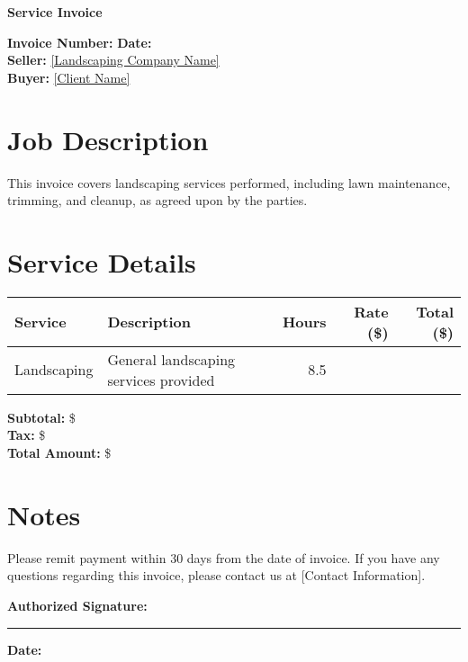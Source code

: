 \documentclass[12pt]{article}
\begin{document}
\begin{center}
    {\Large \textbf{Service Invoice}}\\[0.5cm]
\end{center}

\noindent 
\textbf{Invoice Number:} \underline{\hspace{5cm}} \hfill \textbf{Date:} \underline{\hspace{5cm}}\\[0.5cm]

\noindent 
\textbf{Seller:} \underline{[Landscaping Company Name]}\\[0.2cm]
\noindent 
\textbf{Buyer:} \underline{[Client Name]}\\[0.5cm]

\section*{Job Description}
This invoice covers landscaping services performed, including lawn maintenance, trimming, and cleanup, as agreed upon by the parties.

\section*{Service Details}
\begin{tabularx}{\textwidth}{l X r r r}
\toprule
\textbf{Service} & \textbf{Description} & \textbf{Hours} & \textbf{Rate (\$)} & \textbf{Total (\$)} \\
\midrule
Landscaping & General landscaping services provided & 8.5 & \underline{\hspace{1cm}} & \underline{\hspace{1cm}} \\
\bottomrule
\end{tabularx}

\vspace{0.5cm}
\noindent 
\textbf{Subtotal:} \$\underline{\hspace{2cm}}\\[0.2cm]
\textbf{Tax:} \$\underline{\hspace{2cm}}\\[0.2cm]
\textbf{Total Amount:} \$\underline{\hspace{2cm}}\\[0.5cm]

\section*{Notes}
Please remit payment within 30 days from the date of invoice. If you have any questions regarding this invoice, please contact us at [Contact Information].

\vspace{1cm}

\noindent 
\textbf{Authorized Signature:} \rule{5cm}{0.4pt} \hfill \textbf{Date:} \underline{\hspace{3cm}}
\end{document}
